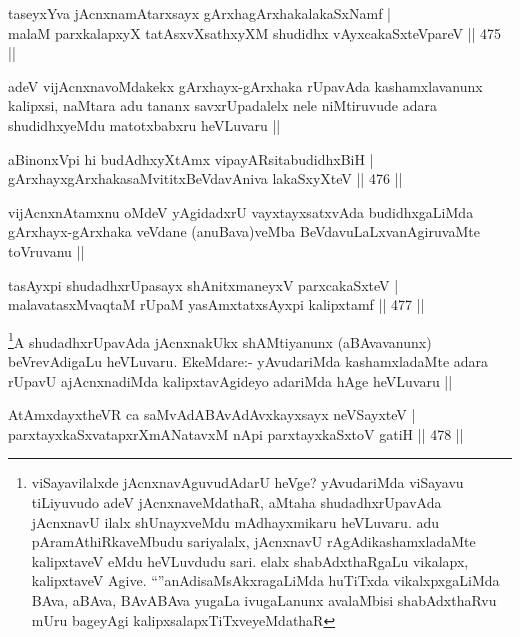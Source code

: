 \begin{shl}
taseyxYva jAcnxnamAtarxsayx gArxhagArxhakalakaSxNamf | \\
malaM parxkalapxyX tatAsxvXsathxyXM shudidhx vAyxcakaSxteV\s pareV \hfill||  475 ||  
\end{shl}

\begin{artha}
adeV vijAcnxnavoMdakekx gArxhayx-gArxhaka rUpavAda kashamxlavanunx kalipxsi, naMtara adu tananx savxrUpadalelx nele niMtiruvude adara shudidhxyeMdu matotxbabxru heVLuvaru ||
\end{artha}

\begin{shl}
aBinonxV\s pi hi budAdhxyXtAmx vipayARsitabudidhxBiH | \\
gArxhayxgArxhakasaMvititxBeVdavAniva lakaSxyXteV \hfill||  476 ||  
\end{shl}

\begin{artha}
vijAcnxnAtamxnu oMdeV yAgidadxrU vayxtayxsatxvAda budidhxgaLiMda gArxhayx-gArxhaka veVdane (anuBava)veMba BeVdavuLaLxvanAgiruvaMte toVruvanu ||
\end{artha}


\begin{shl}
tasAyxpi shudadhxrUpasayx shAnitxmaneyxV parxcakaSxteV | \\
malavatasxMvaqtaM rUpaM yasAmxtatxsAyxpi kalipxtamf \hfill||  477 ||  
\end{shl}

\begin{artha}
\footnote{viSayavilalxde jAcnxnavAguvudAdarU heVge? yAvudariMda viSayavu tiLiyuvudo adeV jAcnxnaveMdathaR, aMtaha shudadhxrUpavAda jAcnxnavU ilalx shUnayxveMdu mAdhayxmikaru heVLuvaru. adu pAramAthiRkaveMbudu sariyalalx, jAcnxnavU rAgAdikashamxladaMte kalipxtaveV eMdu heVLuvdudu sari. elalx shabAdxthaRgaLu vikalapx, kalipxtaveV Agive. ``\stext''anAdisaMsAkxragaLiMda huTiTxda vikalxpxgaLiMda BAva, aBAva, BAvABAva yugaLa ivugaLanunx avalaMbisi shabAdxthaRvu mUru bageyAgi kalipxsalapxTiTxveyeMdathaR}A shudadhxrUpavAda jAcnxnakUkx shAMtiyanunx (aBAvavanunx) beVrevAdigaLu heVLuvaru. EkeMdare:- yAvudariMda kashamxladaMte adara rUpavU ajAcnxnadiMda kalipxtavAgideyo adariMda hAge heVLuvaru ||
\end{artha}

\begin{shl}
AtAmxdayxtheVR ca saMvAdABAvAdAvxkayxsayx neVSayxteV | \\
parxtayxkaSxvatapxrXmANatavxM nApi parxtayxkaSxtoV gatiH \hfill||  478 ||  
\end{shl}

